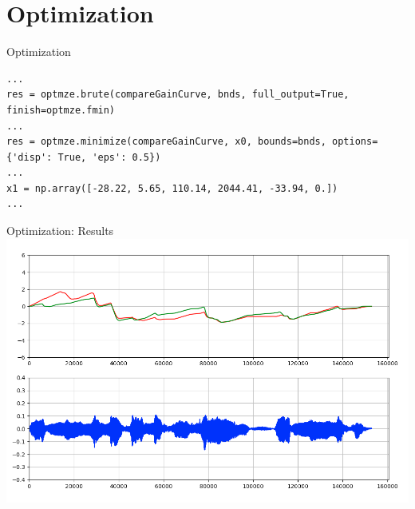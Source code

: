 \section{Optimization}


\begin{frame}[fragile]{Optimization}{}
	\lstset{language=Python}
	\begin{lstlisting}[basicstyle=\tiny]
...
res = optmze.brute(compareGainCurve, bnds, full_output=True, finish=optmze.fmin)
...
res = optmze.minimize(compareGainCurve, x0, bounds=bnds, options={'disp': True, 'eps': 0.5})
...
x1 = np.array([-28.22, 5.65, 110.14, 2044.41, -33.94, 0.])
...
	\end{lstlisting}
\end{frame}

\begin{frame}[c]{Optimization: Results}{}
	\includegraphics[scale=0.32]{images/optiG}
	\centering
\end{frame}
